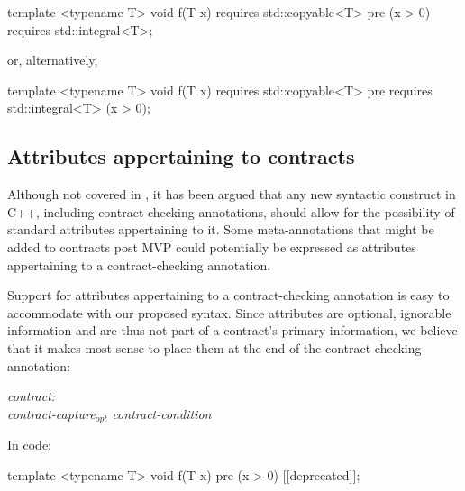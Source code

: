 \vspace{2mm}
\begin{codeblock}
template <typename T>
void f(T x)
  requires std::copyable<T>
  pre (x > 0) requires std::integral<T>;
\end{codeblock}
\vspace{2mm}

or, alternatively,

\vspace{2mm}
\begin{codeblock}
template <typename T>
void f(T x)
  requires std::copyable<T>
  pre requires std::integral<T> (x > 0);
\end{codeblock}
\vspace{2mm}

\subsection{Attributes appertaining to contracts}
\label{subsec:attr}

Although not covered in \cite{P2885R2}, it has been argued that any new syntactic construct in C++, including contract-checking annotations, should allow for the possibility of standard attributes appertaining to it. Some meta-annotations that might be added to contracts post MVP could potentially be expressed as attributes appertaining to a contract-checking annotation.

Support for attributes appertaining to a contract-checking annotation is easy to accommodate with our proposed syntax. Since attributes are optional, ignorable information and are thus not part of a contract's primary information, we believe that it makes most sense to place them at the end of the contract-checking annotation:

\begin{adjustwidth}{0.5cm}{0.5cm}

\emph{contract:} \\
\phantom{~~~}\emph{contract-capture}$_{opt}$ \emph{contract-condition} 

\end{adjustwidth}

In code:

\vspace{2mm}
\begin{codeblock}
template <typename T>
void f(T x)
  pre (x > 0) [[deprecated]];
\end{codeblock}
\vspace{2mm}

